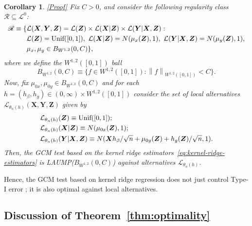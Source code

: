 \documentclass[12pt]{article}
\newtheorem{corollary}{Corollary}
\theoremstyle{definition}
\theoremstyle{remark}
\newcommand{\norm}[1]{\left\lVert{#1}\right\rVert}		%
\newcommand{\prx}{\bm X}								%
\newcommand{\prz}{\bm Z}								%
\newcommand{\pry}{{\bm Y}}								%
\newcommand{\law}{\mathcal L}							%
\newcommand{\nulllaws}{\mathscr L^0}					%
\newcommand{\regclass}{\mathscr R}					    %
\begin{document}
	\begin{corollary}\label{cor:RKHS_example} \hyperref[sec:proof-rkhs]{\textnormal{[Proof]}}
		Fix $C>0$, and consider the following regularity class $\regclass \subseteq \nulllaws$:
		\begin{equation}
			\begin{split}
				\regclass \equiv \{&\law(\prx, \pry, \prz)=\law(\prz)\times \law(\prx|\prz)\times\law(\pry|\prx,\prz):\\
				&\law(\prz) = \textnormal{Unif}([0,1]),\ \law(\prx|\prz) = N(\mu_x(\prz), 1),\ \law(\pry|\prx, \prz) = N(\mu_{y}(\prz), 1), \\
				&\mu_x, \mu_y \in B_{W^{1,2}}(0, C)\},
			\end{split}
		\end{equation}
		where we define the $W^{1,2}([0,1])$ ball
		\begin{equation}
			B_{W^{1,2}}(0, C) \equiv \{f \in W^{1,2}([0,1]): \norm{f}_{W^{1,2}([0,1])} < C\}.
		\end{equation}
		Now, fix $\mu_{0x}, \mu_{0y} \in B_{W^{1,2}}(0, C)$ and for each $h=(h_\beta,h_g)\in(0,\infty)\times W^{1,2}([0,1])$ consider the set of local alternatives $\law_{\theta_n(h)}(\prx, \pry, \prz)$ given by 
		\begin{equation}
			\begin{split}
				&\law_{\theta_n(h)}(\prz) \equiv \textnormal{Unif}([0,1]); \\
				&\law_{\theta_n(h)}(\prx|\prz) \equiv N(\mu_{0x}(\prz), 1); \\
				&\law_{\theta_n(h)}(\pry|\prx, \prz) \equiv N(\prx h_\beta/\sqrt{n} + \mu_{0y}(\prz) + h_g(\prz)/\sqrt{n}, 1).
			\end{split}
		\end{equation}
		Then, the GCM test based on the kernel ridge estimators~\eqref{eq:kernel-ridge-estimators} is LAUMP($B_{W^{1,2}}(0, C)$) against alternatives $\law_{\theta_n(h)}$.
	\end{corollary}
	
	Hence, the GCM test based on kernel ridge regression does not just control Type-I error \citep[Theorem 11]{Shah2018}; it is also optimal against local alternatives.
	
	\subsection{Discussion of Theorem~\ref{thm:optimality}} \label{sec:semiparametric-discussion}
	
\end{document}
